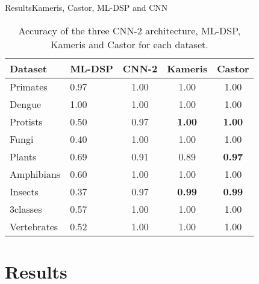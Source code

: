 \documentclass[10pt]{beamer}
\newcommand{\1}{
        	\setbeamertemplate{background}{
        		\texttt{[image: img/1]}
        		\tikz[overlay] \fill[fill opacity=0.75,fill=white] (0,0) rectangle (-\paperwidth,\paperheight);
        	}
}
\begin{document}
\begin{frame}{Results}{Kameris, Castor, ML-DSP and CNN}
	
	\begin{table}[]
		\centering
		\caption{Accuracy of the three CNN-2 architecture, ML-DSP, Kameris and Castor for each dataset.}
		\label{tab:acc_cnn_full}	
		\begin{tabular}{p{2cm}p{1.6cm}ccc}
			\hline
			Dataset          & ML-DSP & CNN-2 & Kameris       & Castor        \\ \hline			
			Primates    & 0.97   & 1.00  & 1.00          & 1.00          \\
			Dengue      & 1.00   & 1.00  & 1.00          & 1.00          \\
			Protists    & 0.50   & 0.97  & \textbf{1.00} & \textbf{1.00} \\
			Fungi       & 0.40   & 1.00  & 1.00          & 1.00          \\
			Plants      & 0.69   & 0.91  & 0.89          & \textbf{0.97} \\
			Amphibians  & 0.60   & 1.00  & 1.00          & 1.00          \\
			Insects     & 0.37   & 0.97  & \textbf{0.99} & \textbf{0.99} \\
			3classes    & 0.57   & 1.00  & 1.00          & 1.00          \\
			Vertebrates & 0.52   & 1.00  & 1.00          & 1.00         \\ \hline
		\end{tabular}
	\end{table}
	
\end{frame}


\section{Results}
\end{document}

